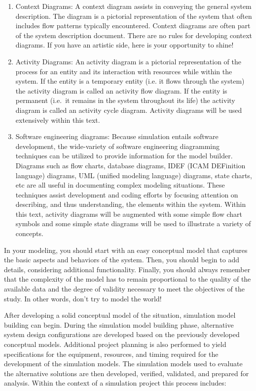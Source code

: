 \documentclass[
]{book}
\theoremstyle{definition}
\theoremstyle{definition}
\theoremstyle{definition}
\theoremstyle{definition}
\theoremstyle{remark}
\begin{document}
\begin{enumerate}
\def\labelenumi{\arabic{enumi}.}
\item
  Context Diagrams: A context diagram assists in conveying the general
  system description. The diagram is a pictorial representation of the
  system that often includes flow patterns typically encountered.
  Context diagrams are often part of the system description document.
  There are no rules for developing context diagrams. If you have an
  artistic side, here is your opportunity to shine!
\item
  Activity Diagrams: An activity diagram is a pictorial representation
  of the process for an entity and its interaction with resources
  while within the system. If the entity is a temporary entity (i.e.
  it flows through the system) the activity diagram is called an
  activity flow diagram. If the entity is permanent (i.e.~it remains
  in the system throughout its life) the activity diagram is called an
  activity cycle diagram. Activity diagrams will be used extensively
  within this text.
\item
  Software engineering diagrams: Because simulation entails software
  development, the wide-variety of software engineering diagramming
  techniques can be utilized to provide information for the model
  builder. Diagrams such as flow charts, database diagrams, IDEF (ICAM
  DEFinition language) diagrams, UML (unified modeling language)
  diagrams, state charts, etc are all useful in documenting complex
  modeling situations. These techniques assist development and coding
  efforts by focusing attention on describing, and thus understanding,
  the elements within the system. Within this text, activity diagrams
  will be augmented with some simple flow chart symbols and some
  simple state diagrams will be used to illustrate a variety of
  concepts.
\end{enumerate}

In your modeling, you should start with an easy conceptual model that
captures the basic aspects and behaviors of the system. Then, you should
begin to add details, considering additional functionality. Finally, you
should always remember that the complexity of the model has to remain
proportional to the quality of the available data and the degree of
validity necessary to meet the objectives of the study. In other words,
don't try to model the world!

After developing a solid conceptual model of the situation, simulation
model building can begin. During the simulation model building phase,
alternative system design configurations are developed based on the
previously developed conceptual models. Additional project planning is
also performed to yield specifications for the equipment, resources, and
timing required for the development of the simulation models. The
simulation models used to evaluate the alternative solutions are then
developed, verified, validated, and prepared for analysis. Within the
context of a simulation project this process includes:
\end{document}
